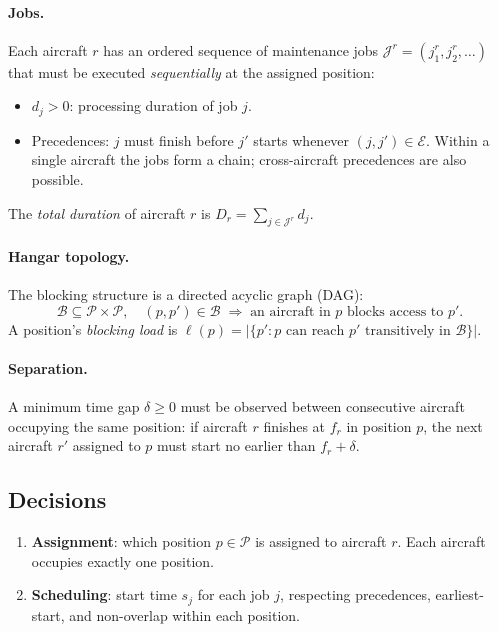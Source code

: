 \paragraph{Jobs.}
Each aircraft $r$ has an ordered sequence of maintenance jobs
$\mathcal{J}^r = (j_1^r, j_2^r, \ldots)$ that must be executed
\emph{sequentially} at the assigned position:
\begin{itemize}[noitemsep]
    \item $d_j > 0$: processing duration of job $j$.
    \item Precedences: $j$ must finish before $j'$ starts whenever $(j,j')
          \in \mathcal{E}$.  Within a single aircraft the jobs form a chain;
          cross-aircraft precedences are also possible.
\end{itemize}
The \emph{total duration} of aircraft $r$ is $D_r = \sum_{j \in \mathcal{J}^r} d_j$.

\paragraph{Hangar topology.}
The blocking structure is a directed acyclic graph (DAG):
\[
    \mathcal{B} \subseteq \mathcal{P} \times \mathcal{P},
    \quad (p, p') \in \mathcal{B} \;\Rightarrow\;
    \text{an aircraft in } p \text{ blocks access to } p'.
\]
A position's \emph{blocking load} is
$\ell(p) = |\{p' : p \text{ can reach } p' \text{ transitively in } \mathcal{B}\}|$.

\paragraph{Separation.}
A minimum time gap $\delta \geq 0$ must be observed between consecutive aircraft
occupying the same position: if aircraft $r$ finishes at $f_r$ in position $p$,
the next aircraft $r'$ assigned to $p$ must start no earlier than
$f_r + \delta$.

\subsection{Decisions}

\begin{enumerate}[noitemsep]
    \item \textbf{Assignment}: which position $p \in \mathcal{P}$ is assigned to
          aircraft $r$.  Each aircraft occupies exactly one position.
    \item \textbf{Scheduling}: start time $s_j$ for each job $j$, respecting
          precedences, earliest-start, and non-overlap within each position.
\end{enumerate}

